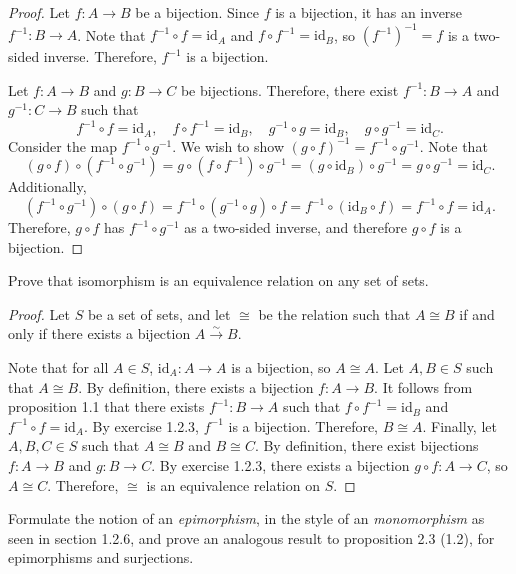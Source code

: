 \documentclass[11pt]{report}
\begin{document}
\begin{proof}
	Let $f : A \to B$ be a bijection. Since $f$ is a bijection, it has an inverse $f^{-1}: B \to A$. Note that $f^{-1}\circ f=\mathrm{id}_A$ and $f\circ f^{-1}=\mathrm{id}_B$, so $\left( f^{-1} \right) ^{-1}=f$ is a two-sided inverse. Therefore, $f^{-1}$ is a bijection.

	Let $f : A \to B$ and $g : B \to C$ be bijections. Therefore, there exist $f^{-1}: B \to A$ and $g^{-1}: C \to B$ such that
\[
	f^{-1}\circ f=\mathrm{id}_A,\quad f\circ f^{-1}=\mathrm{id}_B,\quad g^{-1}\circ g=\mathrm{id}_B,\quad g\circ g^{-1}=\mathrm{id}_C
.\]
	Consider the map $f^{-1}\circ g^{-1}$. We wish to show $(g\circ f)^{-1}=f^{-1}\circ g^{-1}$. Note that
	\[
		(g\circ f)\circ \left( f^{-1}\circ g^{-1} \right) =g\circ \left( f\circ f^{-1} \right) \circ g^{-1}=(g\circ \mathrm{id} _B)\circ g^{-1}=g\circ g^{-1}=\mathrm{id}_C
	.\]
	Additionally,
	\[
		\left( f^{-1}\circ g^{-1} \right) \circ (g\circ f)=f^{-1}\circ \left( g^{-1}\circ g \right) \circ f=f^{-1}\circ (\mathrm{id}_B \circ f)=f^{-1}\circ f=\mathrm{id}_A
	.\]
	Therefore, $g\circ f$ has $f^{-1}\circ g^{-1}$ as a two-sided inverse, and therefore $g\circ f$ is a bijection.
\end{proof}
\begin{exercise}
	Prove that isomorphism is an equivalence relation on any set of sets.
\end{exercise}
\begin{proof}
	Let $S$ be a set of sets, and let $\cong $ be the relation such that $A\cong B$ if and only if there exists a bijection $A\xrightarrow{\sim }B$.

	Note that for all $A\in S$, $\mathrm{id}_A : A \to A$ is a bijection, so $A\cong A$. Let $A,B\in S$ such that $A\cong B$. By definition, there exists a bijection $f : A \to B$. It follows from proposition 1.1 that there exists $f^{-1}: B \to A$ such that $f\circ f^{-1}=\mathrm{id}_B$ and $f^{-1}\circ f=\mathrm{id}_A$. By exercise 1.2.3, $f^{-1}$ is a bijection. Therefore, $B\cong A$. Finally, let $A,B,C\in S$ such that $A\cong B$ and $B\cong C$. By definition, there exist bijections $f : A \to B$ and $g : B \to C$. By exercise 1.2.3, there exists a bijection $g\circ f : A \to C$, so $A\cong C$. Therefore, $\cong $ is an equivalence relation on $S$.
\end{proof}
\begin{exercise}
	Formulate the notion of an \emph{epimorphism}, in the style of an \emph{monomorphism} as seen in section 1.2.6, and prove an analogous result to proposition 2.3 (1.2), for epimorphisms and surjections.
\end{exercise}
\end{document}
